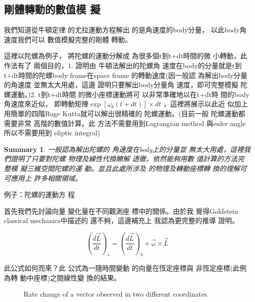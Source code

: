 \documentclass[12pt,a4paper]{article}
\newtheorem{summary}[theorem]{Summary}
\begin{document}
\subsection{剛體轉動的數值模%
擬}

我們知道從牛頓定律%
的尤拉運動方程解出%
的是角速度的body分量，%
以此body角速度我們可以%
數值模擬完整的剛體%
轉動。

這裡以陀螺為例子，%
將陀螺的運動分解成%
為很多個t到t+dt時間的微%
小轉動，此作法有了%
兩個目的，1. 證明由%
牛頓法解出的陀螺角%
速度在body的分量就是t到%
t+dt時間的陀螺body frame在space frame%
的轉動速度(因一般認%
為解出body分量的角速度%
並無太大用處，這邊%
證明只要解出body分量角%
速度，即可完整模擬%
陀螺運動。)2. t到t+dt時間%
的微小座標運動將可%
以非常準確地以在t+dt時%
間的body角速度來近似，%
即轉動矩陣$\exp [\omega _{b}(t+dt)]\times dt$%
，這裡將展示以此近%
似加上用簡單的四階Ruge
Kutta就可以解出很精確的%
陀螺運動。(目前一般%
陀螺運動都需要非常%
高階的數值計算。此%
方法不需要用到Lagrangian method%
與euler angle所以不需要用到%
eliptic integral)

\begin{summary}
一般認為解出陀螺的%
角速度在body上的分量並%
無太大用處，這裡我%
們證明了只要對陀螺%
物理及線性代換瞭解%
透徹，依然能夠用數%
值計算的方法完整模%
擬三維空間陀螺的運%
動。並且此處所涉及%
的物理及轉動座標轉%
換的理解可可應用上%
許多相關領域。
\end{summary}

例子：陀螺的運動方%
程

首先我們先討論向量%
變化量在不同觀測座%
標中的關係。由於我%
覺得Goldstein classical mechanics中描述的%
還不夠，這邊補充上%
我認為更完整的推導%
證明。

\begin{equation}
\left( \frac{d\vec{L}}{dt}\right) _{s}=\left( \frac{d\vec{L}}{dt}\right)
_{b}+\vec{\omega}\times \vec{L}
\end{equation}

此公式如何而來？此%
公式為一隨時間變動%
的向量在恆定座標與%
非恆定座標(此例為轉%
動中座標)之間線性變%
換的結果。

\begin{figure}
[th]
\caption{Rate change of a vector observed in two different coordinates.}
\begin{center}
\end{center}
\end{figure}
\end{document}
